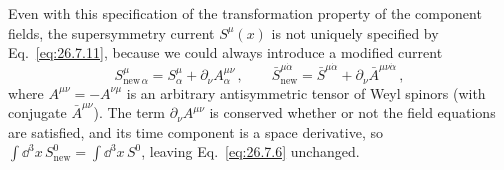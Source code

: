 Even with this specification of the transformation property of the component
fields, the supersymmetry current \(S^\mu(x)\) is not uniquely specified by
Eq.~\eqref{eq:26.7.11}, because we could always introduce a modified current
\begin{equation}
  S_{\mathrm{new}\,\alpha}^\mu
  =S^\mu_\alpha+\partial_\nu A_\alpha^{\mu\nu}\,,
  \qquad
  \bar S_{\mathrm{new}}^{\mu\dot\alpha}
  =\bar S^{\mu\dot\alpha}+\partial_\nu\bar A^{\mu\nu\dot\alpha}\,,
  \tag{26.7.16}\label{eq:26.7.16}
\end{equation}
where \(A^{\mu\nu}=-A^{\nu\mu}\) is an arbitrary antisymmetric tensor of
Weyl spinors (with conjugate \(\bar A^{\mu\nu}\)). The term
\(\partial_\nu A^{\mu\nu}\) is conserved whether
or not the field equations are satisfied, and its time component is a space
derivative, so \(\int \dd^3x\,S_{\mathrm{new}}^0=\int \dd^3x\,S^0\), leaving
Eq.~\eqref{eq:26.7.6} unchanged.

